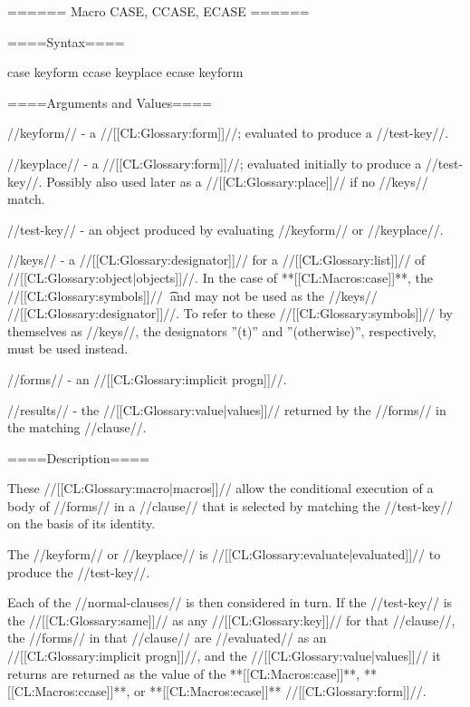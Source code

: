 ====== Macro CASE, CCASE, ECASE ======

====Syntax====

\DefmacWithValues case {keyform  } {} \DefmacWithValues ccase {keyplace } {} \DefmacWithValues ecase {keyform } {}

   

====Arguments and Values====

//keyform// - a //[[CL:Glossary:form]]//; evaluated to produce a //test-key//.

//keyplace// - a //[[CL:Glossary:form]]//; evaluated initially to produce a //test-key//. Possibly also used later as a //[[CL:Glossary:place]]// if no //keys// match.

//test-key// - an object produced by evaluating //keyform// or //keyplace//.

//keys// - a //[[CL:Glossary:designator]]// for a //[[CL:Glossary:list]]// of //[[CL:Glossary:object|objects]]//. In the case of **[[CL:Macros:case]]**, the //[[CL:Glossary:symbols]]// \t\ and  may not be used as the //keys// //[[CL:Glossary:designator]]//. To refer to these //[[CL:Glossary:symbols]]// by themselves as //keys//, the designators ''(t)'' and ''(otherwise)'', respectively, must be used instead.

//forms// - an //[[CL:Glossary:implicit progn]]//.

//results// - the //[[CL:Glossary:value|values]]// returned by the //forms// in the matching //clause//.

====Description====

These //[[CL:Glossary:macro|macros]]// allow the conditional execution of a body of //forms// in a //clause// that is selected by matching the //test-key// on the basis of its identity.

The //keyform// or //keyplace// is //[[CL:Glossary:evaluate|evaluated]]// to produce the //test-key//.

Each of the //normal-clauses// is then considered in turn. If the //test-key// is the //[[CL:Glossary:same]]// as any //[[CL:Glossary:key]]// for that //clause//, the //forms// in that //clause// are //evaluated// as an //[[CL:Glossary:implicit progn]]//, and the //[[CL:Glossary:value|values]]// it returns are returned as the value of the **[[CL:Macros:case]]**, **[[CL:Macros:ccase]]**, or **[[CL:Macros:ecase]]** //[[CL:Glossary:form]]//.

